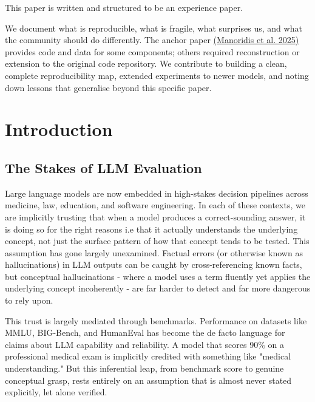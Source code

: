 \documentclass[sigconf,authordraft]{acmart}
\begin{document}
\maketitle
\begin{tcolorbox}[colback=blue!5!white,
                  colframe=blue!60!black,
                  title=Overview of Reproducibility Efforts and Contributions]

This paper is written and structured to be an experience paper. 

We document what is reproducible, what is fragile, what surprises us, and what the community should do differently. The anchor paper \href{https://arxiv.org/abs/2506.21521}{(Manoridis et al. 2025)} provides code and data for some components; others required reconstruction or extension to the original code repository. We contribute to building a clean, complete reproducibility map, extended experiments to newer models, and noting down lessons that generalise beyond this specific paper.
\end{tcolorbox}

\section{Introduction}
\subsection{The Stakes of LLM Evaluation}

Large language models are now embedded in high-stakes decision pipelines across medicine, law, education, and software engineering. In each of these contexts, we are implicitly trusting that when a model produces a correct-sounding answer, it is doing so for the right reasons i.e that it actually understands the underlying concept, not just the surface pattern of how that concept tends to be tested.
This assumption has gone largely unexamined. Factual errors (or otherwise known as hallucinations) in LLM outputs can be caught by cross-referencing known facts, but conceptual hallucinations - where a model uses a term fluently yet applies the underlying concept incoherently - are far harder to detect and far more dangerous to rely upon.

This trust is largely mediated through benchmarks. Performance on datasets like MMLU, BIG-Bench, and HumanEval has become the de facto language for claims about LLM capability and reliability. A model that scores 90\% on a professional medical exam is implicitly credited with something like "medical understanding." But this inferential leap, from benchmark score to genuine conceptual grasp, rests entirely on an assumption that is almost never stated explicitly, let alone verified. 
\end{document}
